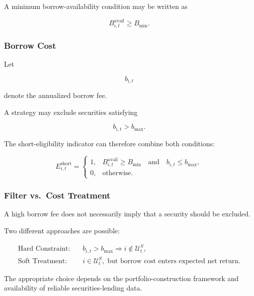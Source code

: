 \documentclass[11pt,a4paper]{article}
\begin{document}
A minimum borrow-availability condition may be written as

\begin{equation}
B_{i,t}^{\mathrm{avail}}
\geq
B_{\min}.
\end{equation}


\subsubsection{Borrow Cost}

Let

\begin{equation}
b_{i,t}
\end{equation}

denote the annualized borrow fee.

A strategy may exclude securities satisfying

\begin{equation}
b_{i,t}
>
b_{\max}.
\end{equation}

The short-eligibility indicator can therefore combine both conditions:

\begin{equation}
E_{i,t}^{\mathrm{short}}
=
\begin{cases}
1,
&
B_{i,t}^{\mathrm{avail}}
\geq
B_{\min}
\quad\text{and}\quad
b_{i,t}
\leq
b_{\max},
\\
0,
&
\text{otherwise}.
\end{cases}
\end{equation}


\subsubsection{Filter vs.\ Cost Treatment}

A high borrow fee does not necessarily imply that a security should be
excluded.

Two different approaches are possible:

\begin{equation}
\boxed{
\begin{aligned}
\text{Hard Constraint:}
&\quad
b_{i,t}>b_{\max}
\Rightarrow
i\notin\mathcal{U}_t^{S},
\\[0.15cm]
\text{Soft Treatment:}
&\quad
i\in\mathcal{U}_t^{S},
\text{ but borrow cost enters expected net return.}
\end{aligned}
}
\end{equation}

The appropriate choice depends on the portfolio-construction framework and
availability of reliable securities-lending data.
\end{document}
